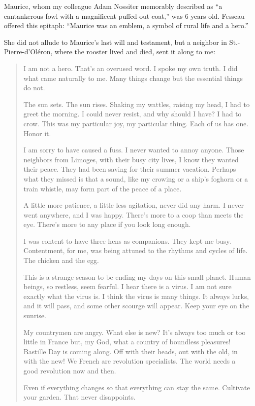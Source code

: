 Maurice, whom my colleague Adam Nossiter memorably described as ``a
cantankerous fowl with a magnificent puffed-out coat,'' was 6 years old.
Fesseau offered this epitaph: ``Maurice was an emblem, a symbol of rural
life and a hero.''

She did not allude to Maurice's last will and testament, but a neighbor
in St.-Pierre-d'Oléron, where the rooster lived and died, sent it along
to me:

\begin{quote}
I am not a hero. That's an overused word. I spoke my own truth. I did
what came naturally to me. Many things change but the essential things
do not.

The sun sets. The sun rises. Shaking my wattles, raising my head, I had
to greet the morning. I could never resist, and why should I have? I had
to crow. This was my particular joy, my particular thing. Each of us has
one. Honor it.

I am sorry to have caused a fuss. I never wanted to annoy anyone. Those
neighbors from Limoges, with their busy city lives, I know they wanted
their peace. They had been saving for their summer vacation. Perhaps
what they missed is that a sound, like my crowing or a ship's foghorn or
a train whistle, may form part of the peace of a place.

A little more patience, a little less agitation, never did any harm. I
never went anywhere, and I was happy. There's more to a coop than meets
the eye. There's more to any place if you look long enough.

I was content to have three hens as companions. They kept me busy.
Contentment, for me, was being attuned to the rhythms and cycles of
life. The chicken and the egg.

This is a strange season to be ending my days on this small planet.
Human beings, so restless, seem fearful. I hear there is a virus. I am
not sure exactly what the virus is. I think the virus is many things. It
always lurks, and it will pass, and some other scourge will appear. Keep
your eye on the sunrise.

My countrymen are angry. What else is new? It's always too much or too
little in France but, my God, what a country of boundless pleasures!
Bastille Day is coming along. Off with their heads, out with the old, in
with the new! We French are revolution specialists. The world needs a
good revolution now and then.

Even if everything changes so that everything can stay the same.
Cultivate your garden. That never disappoints.


\end{quote}
